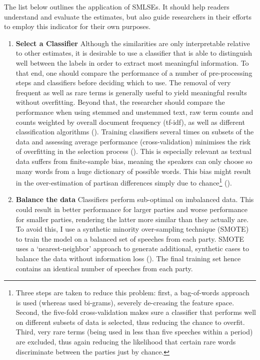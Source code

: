 \documentclass{article}
\begin{document}

The list below outlines the application of SMLSEs. It should help readers understand and evaluate the estimates, but also guide researchers in their efforts to employ this indicator for their own purposes. \medskip


\begin{enumerate}
    \item \textbf{Select a Classifier} \newline Although the similarities are only interpretable relative to other estimates, it is desirable to use a classifier that is able to distinguish well between the labels in order to extract most meaningful information. To that end, one should compare the performance of a number of pre-processing steps and classifiers before deciding which to use. The removal of very frequent as well as rare terms is generally useful to yield meaningful results without overfitting. Beyond that, the researcher should compare the performance when using stemmed and unstemmed text, raw term counts and counts weighted by overall document frequency (tf-idf), as well as different classification algorithms (\cite{Denny2017}). Training classifiers several times on subsets of the data and assessing average performance (cross-validation) minimises the risk of overfitting in the selection process (\cite{Breiman1989}). This is especially relevant as textual data suffers from finite-sample bias, meaning the speakers can only choose so many words from a huge dictionary of possible words. This bias might result in the over-estimation of partisan differences simply due to chance\footnote{Three steps are taken to reduce this problem: first, a bag-of-words approach is used (whereas \citeauthor{Gentzkow2019} used bi-grams), severely de-creasing the feature space. Second, the five-fold cross-validation makes sure a classifier that performs well on different subsets of data is selected, thus reducing the chance to overfit. Third, very rare terms (being used in less than five speeches within a period) are excluded, thus again reducing the likelihood that certain rare words discriminate between the parties just by chance.} (\cite{Gentzkow2019}).  \par
    \item \textbf{Balance the data} \newline Classifiers perform sub-optimal on imbalanced data. This could result in better performance for larger parties and worse performance for smaller parties, rendering the latter more similar than they actually are. To avoid this, I use a synthetic minority over-sampling technique (SMOTE) to train the model on a balanced set of speeches from each party. SMOTE uses a ‘nearest-neighbor’ approach to generate additional, synthetic cases to balance the data without information loss (\cite{Chawla2002}). The final training set hence contains an identical number of speeches from each party. \par

\end{enumerate}
\end{document}
